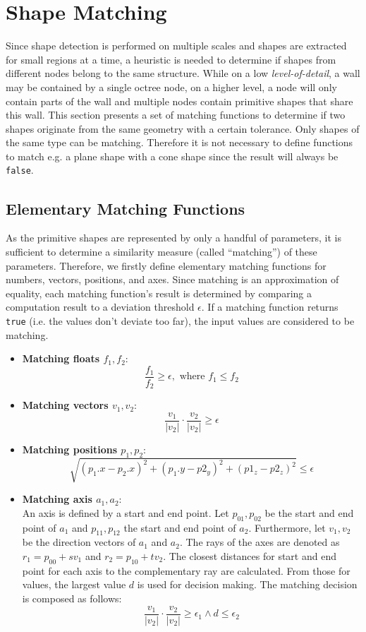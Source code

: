 \section{Shape Matching}
\label{sec:shapeMatching}

Since shape detection is performed on multiple scales and shapes are extracted for small regions at a time, a heuristic is needed to determine if shapes from different nodes belong to the same structure. While on a low \textit{level-of-detail}, a wall may be contained by a single octree node, on a higher level, a node will only contain parts of the wall and multiple nodes contain primitive shapes that share this wall. This section presents a set of matching functions to determine if two shapes originate from the same geometry with a certain tolerance. Only shapes of the same type can be matching. Therefore it is not necessary to define functions to match e.g. a plane shape with a cone shape since the result will always be \verb|false|. 


\subsection{Elementary Matching Functions}
\label{sec:elementarMatchingFuns}

As the primitive shapes are represented by only a handful of parameters, it is sufficient to determine a similarity measure (called "`matching"') of these parameters. Therefore, we firstly define elementary matching functions for numbers, vectors, positions, and axes. Since matching is an approximation of equality, each matching function's result is determined by comparing a computation result to a deviation threshold $\epsilon$. If a matching function returns \verb|true| (i.e. the values don't deviate too far), the input values are considered to be matching. 

\begin{itemize}
    \item \textbf{Matching floats $f_1, f_2$}: 
        $$\frac{f_1}{f_2} \geq \epsilon, \textrm{ where } f_1 \leq f_2$$  
    \item \textbf{Matching vectors $v_1, v_2$}: 
        $$\frac{v_1}{|v_2|} \cdot \frac{v_2}{|v_2|} \geq \epsilon$$
    \item \textbf{Matching positions $p_1, p_2$}: 
        $$\sqrt{(p_1.x - p_2.x)^2 + (p_1.y - p2_y)^2 + (p1_z - p2_z)^2} \leq \epsilon$$
    \item \textbf{Matching axis $a_1, a_2$}: 
    \\
    An axis is defined by a start and end point. Let $p_{01},p_{02}$ be the start and end point of $a_1$ and $p_{11}, p_{12}$ the start and end point of $a_2$. Furthermore, let $v_1, v_2$ be the direction vectors of $a_1$ and $a_2$. The rays of the axes are denoted as $r_1 = p_{00} + sv_1$ and $r_2 = p_{10} + tv_2$. The closest distances for start and end point for each axis to the complementary ray are calculated. From those for values, the largest value $d$ is used for decision making. The matching decision is composed as follows: 
        $$\frac{v_1}{|v_2|} \cdot \frac{v_2}{|v_2|} \geq \epsilon_1 \land d \leq \epsilon_2$$
\end{itemize}


